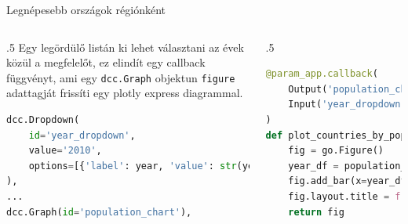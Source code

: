 \documentclass[english, aspectratio=169]{beamer}
\begin{document}
\begin{frame}[fragile]{Legnépesebb országok régiónként}
	\begin{columns}
		\begin{column}{.5\textwidth}
			Egy legördülő listán ki lehet választani az évek közül a megfelelőt, ez elindít egy callback függvényt, ami egy \texttt{dcc.Graph} objektun \texttt{figure} adattagját frissíti egy plotly express diagrammal.
			\begin{lstlisting}[language=python]
dcc.Dropdown(
	id='year_dropdown',
	value='2010',
	options=[{'label': year, 'value': str(year)} for year in range(1974, 2019)]
),
...
dcc.Graph(id='population_chart'),				
			\end{lstlisting}
		\end{column}
		\begin{column}{.5\textwidth}
			\begin{lstlisting}[language=python]
@param_app.callback(
	Output('population_chart', 'figure'),
	Input('year_dropdown', 'value')
)
def plot_countries_by_population(year):
	fig = go.Figure()
	year_df = population_df[['Country Name', year]].sort_values(year, ascending=False)[:20]
	fig.add_bar(x=year_df['Country Name'], y=year_df[year])
	fig.layout.title = f'A húsz legnépesebb ország - {year}'
	return fig				
			\end{lstlisting}
		\end{column}
	\end{columns}
\end{frame}
\end{document}
